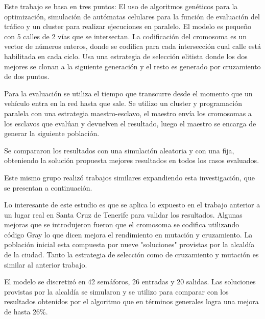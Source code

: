 \begin{itemize}
	\begin{item}
		
		Este trabajo se basa en tres puntos: El uso de algoritmos genéticos para la optimización, simulación de autómatas celulares para la función de evaluación del tráfico y un cluster para realizar ejecuciones en paralelo.
		El modelo es pequeño con 5 calles de 2 vías que se intersectan.
		La codificación del cromosoma es un vector de números enteros, donde se codifica para cada intersección cual calle está habilitada en cada ciclo.
		Usa una estrategia de selección elitista donde los dos mejores se clonan a la siguiente generación y el resto es generado por cruzamiento de dos puntos.
		
		Para la evaluación se utiliza el tiempo que transcurre desde el momento que un vehículo entra en la red hasta que sale. Se utilizo un cluster y programación paralela con una estrategia maestro-esclavo, el maestro envía los cromosomas a los esclavos que evalúan y devuelven el resultado, luego el maestro se encarga de generar la siguiente población.
		
		Se compararon los resultados con una simulación aleatoria y con una fija, obteniendo la solución propuesta mejores resultados en todos los casos evaluados.
		
		Este mismo grupo realizó trabajos similares expandiendo esta investigación, que se presentan a continuación.
	\end{item}
	
	\begin{item}
		\bibentry{Sanchez2008}
		Lo interesante de este estudio es que se aplica lo expuesto en el trabajo anterior a un lugar real en Santa Cruz de Tenerife para validar los resultados.
		Algunas mejoras que se introdujeron fueron que el cromosoma se codifica utilizando código Gray lo que dicen mejora el rendimiento en mutación y cruzamiento. La población inicial esta compuesta por nueve "soluciones" provistas por la alcaldía de la ciudad. Tanto la estrategia de selección como de cruzamiento y mutación es similar al anterior trabajo.
		
		El modelo se discretizó en 42 semáforos, 26 entradas y 20 salidas.
		Las soluciones provistas por la alcaldía se simularon y se utilizo para comparar con los resultados obtenidos por el algoritmo que en términos generales logra una mejora de hasta 26\%.
		
	\end{item}
	

\end{itemize}
